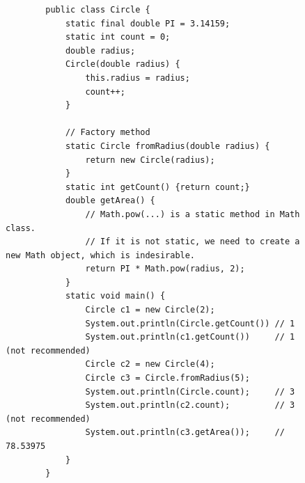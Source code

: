 \documentclass{article}
\begin{document}
\begin{figure}[h]
	\centering
	\begin{verbatim}
		public class Circle {
		    static final double PI = 3.14159;
		    static int count = 0;
		    double radius;
		    Circle(double radius) {
		        this.radius = radius;
		        count++;
		    }
		    
		    // Factory method
		    static Circle fromRadius(double radius) {
		        return new Circle(radius);
		    }
		    static int getCount() {return count;}
		    double getArea() {
		        // Math.pow(...) is a static method in Math class.
		        // If it is not static, we need to create a new Math object, which is indesirable.
		        return PI * Math.pow(radius, 2);
		    }
		    static void main() {
		        Circle c1 = new Circle(2);
		        System.out.println(Circle.getCount()) // 1
		        System.out.println(c1.getCount())     // 1 (not recommended)
		        Circle c2 = new Circle(4);
		        Circle c3 = Circle.fromRadius(5);
		        System.out.println(Circle.count);     // 3
		        System.out.println(c2.count);         // 3 (not recommended)
		        System.out.println(c3.getArea());     // 78.53975
		    }
		}
	\end{verbatim}
\end{figure}
\newpage
\end{document}
